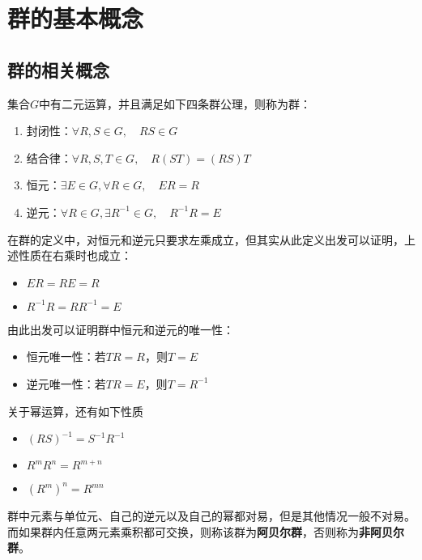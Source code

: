 \chapter{群的基本概念}
\section{群的相关概念}
\begin{definition}[群]
    集合$G$中有二元运算，并且满足如下四条群公理，则称为群：
    \begin{enumerate}
        \item 封闭性：$\forall R,S\in G,\quad RS\in G$
        \item 结合律：$\forall R,S,T\in G,\quad R(ST)=(RS)T$
        \item 恒元：$\exists E\in G,\forall R\in G,\quad ER=R$
        \item 逆元：$\forall R\in G,\exists R^{-1}\in G,\quad R^{-1}R=E$
    \end{enumerate}
\end{definition}
在群的定义中，对恒元和逆元只要求左乘成立，但其实从此定义出发可以证明，上述性质在右乘时也成立：
\begin{property}[恒元和逆元的右乘]
    \indent
    \begin{itemize}
        \item $ER=RE=R$
        \item $R^{-1}R=RR^{-1}=E$
    \end{itemize}
\end{property}
由此出发可以证明群中恒元和逆元的唯一性：
\begin{property}[恒元和逆元的唯一性]
    \indent
    \begin{itemize}
        \item 恒元唯一性：若$TR=R$，则$T=E$
        \item 逆元唯一性：若$TR=E$，则$T=R^{-1}$
    \end{itemize}
\end{property}
关于幂运算，还有如下性质
\begin{property}[幂运算]
    \indent
    \begin{itemize}
        \item $(RS)^{-1}=S^{-1}R^{-1}$
        \item $R^mR^n=R^{m+n}$
        \item $(R^m)^n=R^{mn}$
    \end{itemize}
\end{property}
群中元素与单位元、自己的逆元以及自己的幂都对易，但是其他情况一般不对易。而如果群内任意两元素乘积都可交换，则称该群为\textbf{阿贝尔群}，否则称为\textbf{非阿贝尔群}。

